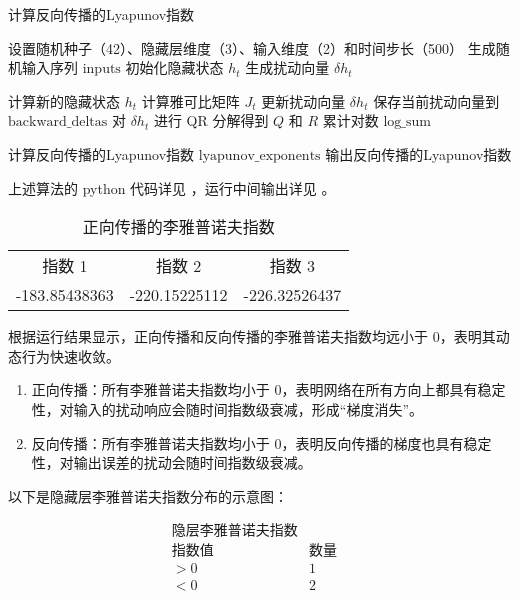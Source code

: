 \begin{algorithm}
   \caption{计算反向传播的Lyapunov指数}
   \begin{algorithmic}[1]
      \STATE 设置随机种子（42）、隐藏层维度（3）、输入维度（2）和时间步长（500）
      \STATE 生成随机输入序列 $\text{inputs}$
      \STATE 初始化隐藏状态 $h_t$
      \STATE 生成扰动向量 $\delta h_t$

            \STATE 计算新的隐藏状态 $h_t$
            \STATE 计算雅可比矩阵 $J_t$
            \STATE 更新扰动向量 $\delta h_t$
            \STATE 保存当前扰动向量到 $\text{backward\_deltas}$
            \STATE 对 $\delta h_t$ 进行 QR 分解得到 $Q$ 和 $R$
            \STATE 累计对数 $\text{log\_sum}$
      \ENDFOR

      \STATE 计算反向传播的Lyapunov指数 $\text{lyapunov\_exponents}$
      \STATE 输出反向传播的Lyapunov指数
   \end{algorithmic}
\end{algorithm}

上述算法的 python 代码详见 \cite{sec:code}，运行中间输出详见 \cite{sec:result}。

\begin{table}[htbp]
   \caption{正向传播的李雅普诺夫指数}
   \begin{tabular}{ccc}
      指数 1 & 指数 2 & 指数 3 \\
      -183.85438363 & -220.15225112 & -226.32526437
   \end{tabular}
\end{table}

根据运行结果显示，正向传播和反向传播的李雅普诺夫指数均远小于 0，表明其动态行为快速收敛。

\begin{enumerate}
   \item 正向传播：所有李雅普诺夫指数均小于 0，表明网络在所有方向上都具有稳定性，对输入的扰动响应会随时间指数级衰减，形成“梯度消失”。
   \item 反向传播：所有李雅普诺夫指数均小于 0，表明反向传播的梯度也具有稳定性，对输出误差的扰动会随时间指数级衰减。
\end{enumerate}

以下是隐藏层李雅普诺夫指数分布的示意图：

\[
\begin{array}{ccc}
\text{隐层李雅普诺夫指数} & & \\
\hline
\text{指数值} & \text{数量} \\
\hline
>0 & 1 \\
<0 & 2 \\
\end{array}
\]

